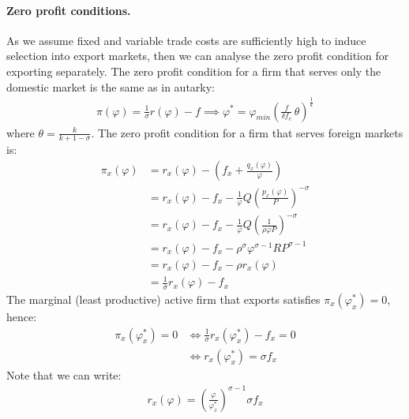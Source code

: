 \begin{solution}
	\paragraph{Zero profit conditions.} As we assume fixed and variable trade costs are sufficiently high to induce selection into export markets, then we can analyse the zero profit condition for exporting separately. The zero profit condition for a firm that serves only the domestic market is the same as in autarky:
	\begin{align*}
		\pi(\varphi) = \frac{1}{\sigma} r(\varphi) - f \implies \varphi^* = \varphi_{min} \left( \frac{f}{\delta f_e}\, \theta \right)^{\frac{1}{k}}
	\end{align*}
	where $\theta = \frac{k}{k + 1 - \sigma}$. The zero profit condition for a firm that serves foreign markets is:
    \begin{align*}
        \pi_x(\varphi) &= r_x(\varphi) - \left( f_x + \frac{q_x(\varphi)}{\varphi} \right) \\
        &= r_x(\varphi) - f_x - \frac{1}{\varphi} Q \left( \frac{p_x(\varphi)}{P} \right)^{-\sigma} \\
        &= r_x(\varphi) - f_x - \frac{1}{\varphi} Q \left( \frac{1}{\rho\varphi P} \right)^{-\sigma} \\
        &= r_x(\varphi) - f_x -  \rho^{\sigma} \varphi^{\sigma - 1} R P^{\sigma - 1} \\
        &= r_x(\varphi) - f_x -  \rho r_x(\varphi) \\
        &= \frac{1}{\sigma} r_x(\varphi) - f_x
    \end{align*}
	The marginal (least productive) active firm that exports satisfies $\pi_x(\varphi_x^*)=0$, hence:
    \begin{align*}
        \pi_x(\varphi_x^*) = 0 &\iff \frac{1}{\sigma} r_x(\varphi_x^*) - f_x = 0 \\
        &\iff r_x(\varphi_x^*) = \sigma f_x
    \end{align*}
    Note that we can write:
    \begin{align*}
        r_x(\varphi) = \left(\frac{\varphi}{\varphi_x^*}\right)^{\sigma - 1} \sigma f_x
    \end{align*}
\end{solution}
